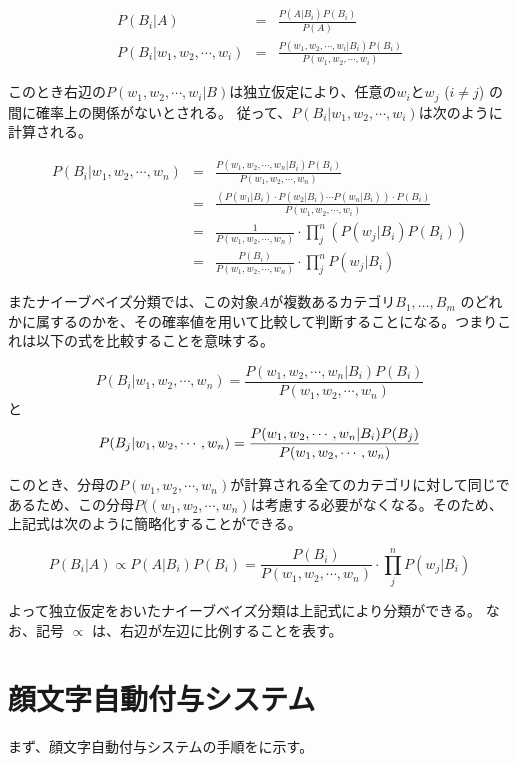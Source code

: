 \documentclass[11pt,a4j]{jsarticle}
\begin{document}
\begin{eqnarray}
  P(B_i|A) & = & \frac{P(A|B_i)P(B_i)}{P(A)} \\
  P(B_i|w_1, w_2, \cdots ,w_i) & = & \frac{P(w_1, w_2, \cdots ,w_i|B_i)P(B_i)}{P(w_1, w_2, \cdots ,w_i)}
\end{eqnarray}

このとき右辺の$P(w_1, w_2, \cdots ,w_i|B)$は独立仮定により、任意の$w_i$と$w_j$ ($i \not = j$) の間に確率上の関係がないとされる。
従って、$P(B_i|w_1, w_2, \cdots ,w_i)$は次のように計算される。

\begin{eqnarray}
  P(B_i|w_1, w_2, \cdots ,w_n) & = & \frac{P(w_1, w_2, \cdots ,w_n|B_i)P(B_i)}{P(w_1, w_2, \cdots ,w_n)}\\
  & = & \frac{(P(w_1|B_i) \cdot P(w_2|B_i) \cdots P(w_n|B_i)) \cdot P(B_i)}{P(w_1, w_2, \cdots ,w_i)}\\
  & = & \frac{1}{P(w_1, w_2, \cdots ,w_n)} \cdot \prod_{j}^{n}(P(w_j|B_i)P(B_i)) \\
  & = & \frac{P(B_i)}{P(w_1, w_2, \cdots ,w_n)} \cdot \prod_{j}^{n} P(w_j|B_i)
\end{eqnarray}

またナイーブベイズ分類では、この対象$A$が複数あるカテゴリ$B_1, \ldots ,B_m$ のどれかに属するのかを、その確率値を用いて比較して判断することになる。つまりこれは以下の式を比較することを意味する。

\[
P(B_i|w_1, w_2, \cdots ,w_n) = \frac{P(w_1, w_2, \cdots ,w_n|B_i)P(B_i)}{P(w_1, w_2, \cdots ,w_n)}
\]
と
\[
P(B_j|w_1, w_2, \cdots ,w_n) = \frac{P(w_1, w_2, \cdots ,w_n|B_i)P(B_j)}{P(w_1, w_2, \cdots ,w_n)}\\
\]

このとき、分母の$P(w_1, w_2, \cdots ,w_n)$が計算される全てのカテゴリに対して同じであるため、この分母$P((w_1, w_2, \cdots ,w_n)$は考慮する必要がなくなる。そのため、上記式は次のように簡略化することができる。

\begin{equation}
  P(B_i|A)\propto P(A|B_i)P(B_i) = \frac{P(B_i)}{P(w_1, w_2, \cdots ,w_n)} \cdot \prod_{j}^{n} P(w_j|B_i)
\end{equation}

よって独立仮定をおいたナイーブベイズ分類は上記式により分類ができる。
なお、記号 $\propto$ は、右辺が左辺に比例することを表す。


\section{顔文字自動付与システム}\label{sec:system}
まず、顔文字自動付与システムの手順をに示す。
\end{document}
